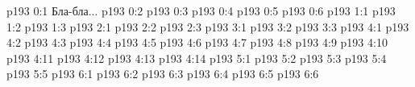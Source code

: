 \author{Промежуточные создания}
\vs p193 0:1  Бла-бла...
\vs p193 0:2 \pc 
\vs p193 0:3 
\vs p193 0:4 
\vs p193 0:5 
\vs p193 0:6 \pc 
{}
\vs p193 1:1 
\vs p193 1:2 \pc 
\vs p193 1:3 \pc 
{}
\vs p193 2:1 
\vs p193 2:2 \pc 
\vs p193 2:3 \pc 
{}
\vs p193 3:1 
\vs p193 3:2 \pc 
\vs p193 3:3 \pc 
{}
\vs p193 4:1 
\vs p193 4:2 
\vs p193 4:3 
\vs p193 4:4 
\vs p193 4:5 
\vs p193 4:6 
\vs p193 4:7 
\vs p193 4:8 
\vs p193 4:9 
\vs p193 4:10 
\vs p193 4:11 
\vs p193 4:12 \pc 
\vs p193 4:13 
\vs p193 4:14 
\vs p193 5:1 
\vs p193 5:2 \pc 
\vs p193 5:3 \pc 
\vs p193 5:4 
\vs p193 5:5 
\vs p193 6:1 
\vs p193 6:2 
\vs p193 6:3 
\vs p193 6:4 \pc 
\vs p193 6:5 
\vs p193 6:6 \pc 
\quizlink
